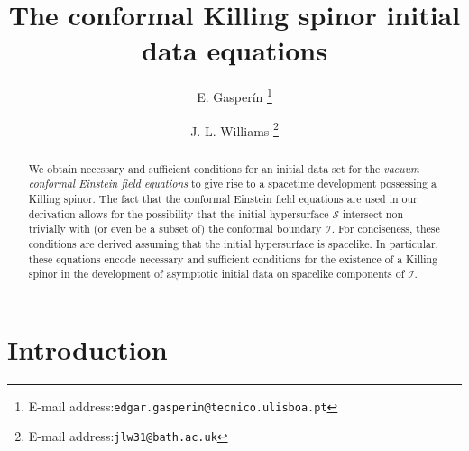 \documentclass[10pt,a4paper]{article}
\theoremstyle{plain}
\begin{document}
\title{\textbf{The conformal Killing spinor initial data equations}}


\author[1]{E. Gasper\'in \footnote{E-mail address:{\tt edgar.gasperin@tecnico.ulisboa.pt}}}
\author[2]{J. L. Williams \footnote{E-mail address:{\tt jlw31@bath.ac.uk}}}



\maketitle
\begin{abstract}
  We obtain necessary and sufficient conditions for an initial data
  set for the \emph{vacuum conformal Einstein field equations} to give
  rise to a spacetime development possessing a Killing spinor.  The
  fact that the conformal Einstein field equations are used in our
  derivation allows for the possibility that the initial hypersurface
  $\mathcal{S}$ intersect non-trivially with (or even be a subset of)
  the conformal boundary $\mathscr{I}$.  For conciseness, these
  conditions are derived assuming that the initial hypersurface is
  spacelike. In particular, these equations encode necessary and
  sufficient conditions for the existence of a Killing spinor in the
  development of asymptotic initial data on spacelike components of
  $\mathscr{I}$.
\end{abstract}


\section{Introduction}
\label{sec:Introduction}
\end{document}
